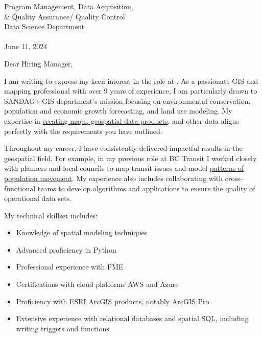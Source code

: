 \documentclass[letterpaper]{article}
\newcommand{\impt}[1]{\uline{#1}}
\begin{document}
\large
Program Management, Data Acquisition, \\
\qquad \& Quality Assurance/ Quality Control \\
Data Science Department \\
\textbf{\JobCompany} \\

\null\hfill June 11, 2024

Dear Hiring Manager,

I am writing to express my keen interest in the
\impt{\JobTitle} role at {\JobCompany}.
As a passionate GIS and mapping professional with over 9 years of
experience, I am particularly drawn to SANDAG's GIS department's
mission focusing on 
environmental conservation, population and economic growth forecasting, and land use modeling.
My expertise in \impt{creating maps, geospatial data products}, and other data
aligns perfectly with the requirements you have outlined.

Throughout my career, I have consistently delivered
impactful results in the geospatial field.
For example, in my previous role at BC Transit I worked closely with
planners and local councils to map transit issues and model 
\impt{patterns of population movement}.
My experience also includes collaborating with cross-functional teams to
develop algorithms and applications to ensure the quality of operational data sets.

My technical skillset includes:
\vspace{-12pt}
\begin{itemize} \itemsep 0pt
\item Knowledge of spatial modeling techniques
\item Advanced proficiency in Python
\item Professional experience with FME
\item Certifications with cloud platforms AWS and Azure
\item Proficiency with ESRI ArcGIS products, notably ArcGIS Pro
\item Extensive experience with relational databases and spatial SQL, including writing triggers and functions
\end{itemize}
\end{document}
